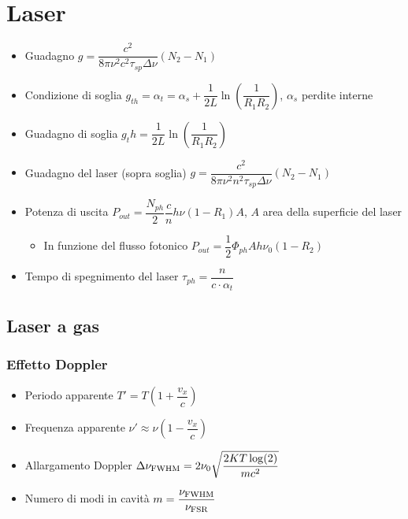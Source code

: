 \documentclass{article}
\begin{document}
\section{Laser}
\begin{itemize}
  \item Guadagno \( g = \dfrac{c^2}{8 \pi \nu^2 c^2 \tau_{sp} \Delta \nu} (N_2 - N_1) \)
  \item Condizione di soglia \( g_{th} = \alpha_t = \alpha_s + \dfrac{1}{2L} \ln\left(\dfrac{1}{R_1 R_2}\right) \), \( \alpha_s \) perdite interne
  \item Guadagno di soglia \( g_th = \dfrac{1}{2L} \ln\left(\dfrac{1}{R_1 R_2}\right)\)
  \item Guadagno del laser (sopra soglia) \( g = \dfrac{c^2}{8 \pi \nu^2 n ^ 2 \tau_{sp} \Delta \nu} (N_2 - N_1) \)
  \item Potenza di uscita \( P_{out} = \dfrac{N_{ph}}{2} \dfrac{c}{n} h \nu (1 - R_1) A \), \( A \) area della superficie del laser
        \begin{itemize}
          \item In funzione del flusso fotonico \( P_{out} = \dfrac{1}{2} \Phi_{ph} A h \nu_0 ( 1 - R_2) \)
        \end{itemize}
  \item Tempo di spegnimento del laser \( \tau_{ph} = \dfrac{n}{c \cdot \alpha_t} \)
\end{itemize}

\subsection{Laser a gas}
\subsubsection{Effetto Doppler}
\begin{itemize}
  \item Periodo apparente \( T ' = T \left( 1 + \dfrac{v_x}{c} \right) \)
  \item Frequenza apparente \( \nu ' \approx \nu \left(1 - \dfrac{v_x}{c} \right) \)
  \item Allargamento Doppler \( \Delta \nu_{\textnormal{FWHM}} = 2 \nu_0 \sqrt{\dfrac{2 K T \log(2)}{m c ^ 2}} \)
  \item Numero di modi in cavità \(m = \dfrac{ \nu_{\textnormal{FWHM}}}{ \nu_{\textnormal{FSR}}} \)
\end{itemize}
\end{document}
